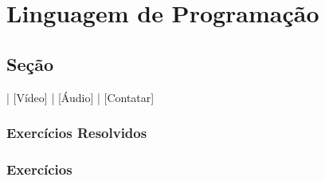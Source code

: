 
\chapter{Linguagem de Programação}\label{cap_lingua}
\thispagestyle{fancy}

\section{Seção}\label{cap_lim_sec_secao}

\begin{flushright}
  [YouTube] | [Vídeo] | [Áudio] | [Contatar]
\end{flushright}

\emconstrucao

\subsection{Exercícios Resolvidos}

\emconstrucao

\subsection{Exercícios}

\emconstrucao
